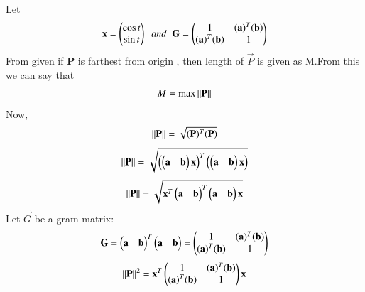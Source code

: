 \documentclass[journal]{IEEEtran}
\theoremstyle{remark}
\begin{document}
Let
\begin{align}
    \Vec{x}= \myvec{\cos{t} \\ \sin{t}} \;\;and\;\;\vec{G}=\myvec{1&(\Vec{a})^T(\Vec{b})\\(\Vec{a})^T(\Vec{b})&1}
\end{align}
From given if \textbf{P} is farthest from origin , then length of $\vec{P}$ is given as M.From this we can say  that
\begin{align}
   M=\text{max}\norm{\Vec{P}}
\end{align}
Now,
\begin{align}
    \norm{\Vec{P}}=\sqrt{(\Vec{P})^T(\Vec{P})}
\end{align}
\begin{align}
    \norm{\Vec{P}}=\sqrt{\brak{\myvec{\Vec{a}&\Vec{b}}\Vec{x}}^T\brak{\myvec{\Vec{a}&\Vec{b}}\Vec{x}}}
\end{align}
\begin{align}
    \norm{\Vec{P}}=\sqrt{\Vec{x}^T\myvec{\Vec{a}&\Vec{b}}^T\myvec{\Vec{a}&\Vec{b}}\Vec{x}}
\end{align}
Let $\Vec{G}$ be a gram matrix:
\begin{align}
    \Vec{G}=\myvec{\Vec{a}&\Vec{b}}^T\myvec{\Vec{a}&\Vec{b}}=\myvec{1&(\Vec{a})^T(\Vec{b})\\(\Vec{a})^T(\Vec{b})&1}
\end{align}
\begin{align}
       \norm{\Vec{P}}^2=\Vec{x}^T\myvec{1&(\Vec{a})^T(\Vec{b})\\(\Vec{a})^T(\Vec{b})&1}\Vec{x}
\end{align}
\end{document}
